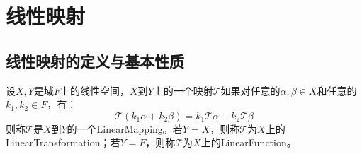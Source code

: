 \section{线性映射}

\subsection{线性映射的定义与基本性质}
\begin{definition}
	设$X,Y$是域$F$上的线性空间，$X$到$Y$上的一个映射$\mathcal{T}$如果对任意的$\alpha,\beta\in X$和任意的$k_1,k_2\in F$，有：
	\begin{equation*}
		\mathcal{T}(k_1\alpha+k_2\beta)=k_1\mathcal{T}\alpha+k_2\mathcal{T}\beta
	\end{equation*}
	则称$\mathcal{T}$是$X$到$Y$的一个\gls{LinearMapping}。若$Y=X$，则称$\mathcal{T}$为$X$上的\gls{LinearTransformation}；若$Y=F$，则称$\mathcal{T}$为$X$上的\gls{LinearFunction}。
\end{definition}
